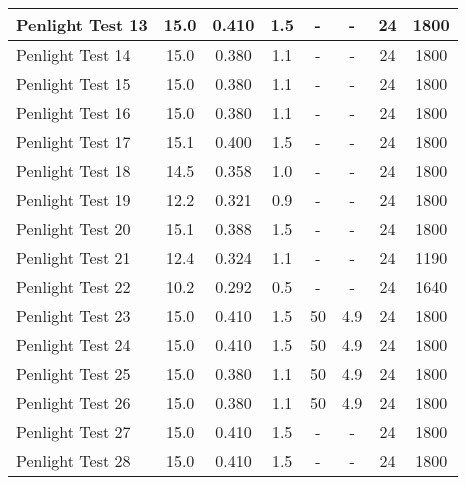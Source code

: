 \begin{table}[!ht]
\begin{center}
\begin{tabular}{|l|c|c|c|c|c|c|c|}
Penlight Test 13  &  15.0      &  0.410        &  1.5        &  -         &  -          &  24           &  1800       \\ \hline
Penlight Test 14  &  15.0      &  0.380        &  1.1        &  -         &  -          &  24           &  1800       \\ \hline
Penlight Test 15  &  15.0      &  0.380        &  1.1        &  -         &  -          &  24           &  1800       \\ \hline
Penlight Test 16  &  15.0      &  0.380        &  1.1        &  -         &  -          &  24           &  1800       \\ \hline
Penlight Test 17  &  15.1      &  0.400        &  1.5        &  -         &  -          &  24           &  1800       \\ \hline
Penlight Test 18  &  14.5      &  0.358        &  1.0        &  -         &  -          &  24           &  1800       \\ \hline
Penlight Test 19  &  12.2      &  0.321        &  0.9        &  -         &  -          &  24           &  1800       \\ \hline
Penlight Test 20  &  15.1      &  0.388        &  1.5        &  -         &  -          &  24           &  1800       \\ \hline
Penlight Test 21  &  12.4      &  0.324        &  1.1        &  -         &  -          &  24           &  1190       \\ \hline
Penlight Test 22  &  10.2      &  0.292        &  0.5        &  -         &  -          &  24           &  1640       \\ \hline
Penlight Test 23  &  15.0      &  0.410        &  1.5        &  50        &  4.9        &  24           &  1800       \\ \hline
Penlight Test 24  &  15.0      &  0.410        &  1.5        &  50        &  4.9        &  24           &  1800       \\ \hline
Penlight Test 25  &  15.0      &  0.380        &  1.1        &  50        &  4.9        &  24           &  1800       \\ \hline
Penlight Test 26  &  15.0      &  0.380        &  1.1        &  50        &  4.9        &  24           &  1800       \\ \hline
Penlight Test 27  &  15.0      &  0.410        &  1.5        &  -         &  -          &  24           &  1800       \\ \hline
Penlight Test 28  &  15.0      &  0.410        &  1.5        &  -         &  -          &  24           &  1800       \\ \hline

\end{tabular}
\end{center}
\end{table}
